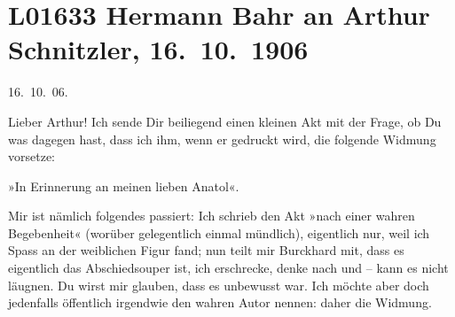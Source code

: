 

\section[Hermann Bahr an Arthur Schnitzler, 16. 10. 1906]{L01633 Hermann Bahr an Arthur Schnitzler, 16. 10. 1906}
\nopagebreak{}
\rehead{ }\normalsize\beginnumbering{}
\toendnotes[C]{\smallbreak\pagebreak[2]}
\toendnotes[C]{\smallbreak}
\pstart
           \raggedleft{}{\pb}16. 10. 06.\pend
           
\pstart\center{}Lieber Arthur!\pend\vspace{0.5em}
\pstart
           Ich sende Dir beiliegend einen kleinen Akt mit der Frage, ob Du was dagegen hast, dass ich ihm,
               wenn er gedruckt wird, die folgende Widmung vorsetze:\pend
           
\pstart
           \centering{}»In Erinnerung an meinen lieben Anatol«.\pend
           
\pstart
           Mir ist nämlich folgendes passiert: Ich schrieb den Akt »nach einer wahren
               Begebenheit« (worüber gelegentlich einmal mündlich), eigentlich nur, weil ich Spass
               an der weiblichen Figur fand; nun teilt mir Burckhard mit, dass es eigentlich das Abschiedsouper ist, ich erschrecke, denke nach und – {\pb}kann es nicht läugnen. Du wirst mir glauben, dass
               es unbewusst war. Ich möchte aber doch jedenfalls öffentlich irgendwie den wahren
               Autor nennen: daher die Widmung.\pend
           
